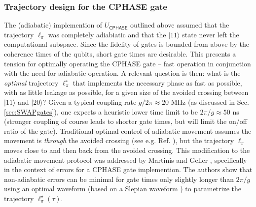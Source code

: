 \documentclass[aip,apr,twocolumn,showpacs,superscriptaddress,groupedaddress,nofootinbib,reprint]{revtex4-1}  %
\newcommand{\CPHASE}{\textsf{CPHASE}}
\begin{document}
\subsubsection{Trajectory design for the \CPHASE{} gate}
The (adiabatic) implemention of $U_\CPHASE$ outlined above assumed that the trajectory $\ell_\pi$ was completely adiabiatic and that the $|11\rangle$ state never left the computational subspace. Since the fidelity of gates is bounded from above by the coherence times of the qubits, short gate times are desirable\cite{Ashhab2012}. This presents a tension for optimally operating the \CPHASE{} gate -- fast operation in conjunction with the need for adiabatic operation. A relevant question is then: what is the \emph{optimal} trajectory $\ell^\star_\pi$ that implements the necessary phase as fast as possible, with as little leakage as possible, for a given size of the avoided crossing between $|11\rangle$ and $|20\rangle$? Given a typical coupling rate $g/2\pi \approx 20$ MHz (as discussed in Sec. \ref{sec:SWAPgates}), one expects a heuristic lower time limit to be $2\pi/g \approx 50$ ns (stronger coupling of course leads to shorter gate times, but will limit the on/off ratio of the gate). Traditional optimal control of adiabatic movement assumes the movement is \emph{through} the avoided crossing (see e.g. Ref. ), but the trajectory $\ell_\pi$ moves close to and then back from the avoided crossing. This modification to the adiabatic movement protocol was addressed by Martinis and Geller \cite{Martinis2014}, specifically in the context of errors for a \CPHASE{} gate implemention. The authors show that non-adiabatic errors can be minimal for gate times only slightly longer than $2\pi/g$ using an optimal waveform (based on a Slepian waveform \cite{Slepian}) to parametrize the trajectory $\ell_\pi^\star(\tau)$.
\end{document}
